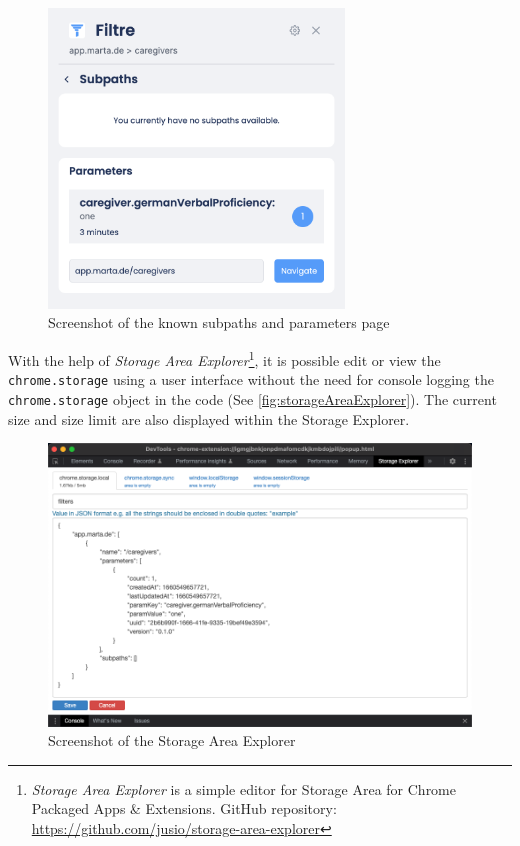 \begin{figure}[H]
  \centering
  \includegraphics[width=0.7\textwidth]{assets/Filtre_parameters.png}
  \caption{Screenshot of the known subpaths and parameters page}
  \label{fig:filtreParameters}
\end{figure}

With the help of \emph{Storage Area Explorer}\footnote{\emph{Storage Area Explorer} is a simple editor for Storage Area for Chrome Packaged Apps \& Extensions. GitHub repository: \url{https://github.com/jusio/storage-area-explorer}}, it is possible edit or view the \texttt{chrome.storage} using a user interface without the need for console logging the \texttt{chrome.storage} object in the code (See \autoref{fig:storageAreaExplorer}). The current size and size limit are also displayed within the Storage Explorer.

\begin{figure}[H]
  \includegraphics[width=\textwidth]{assets/Storage_area_explorer.png}
  \caption{Screenshot of the Storage Area Explorer}
  \label{fig:storageAreaExplorer}
\end{figure}

